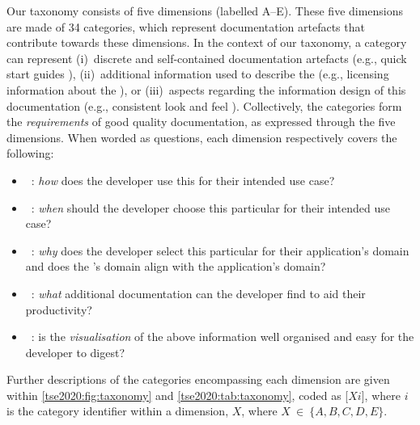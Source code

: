 Our taxonomy consists of five dimensions (labelled A--E). These five dimensions are made of 34 categories, which represent   documentation artefacts that contribute towards these dimensions. In the context of our taxonomy, a category can represent (i)~discrete and self-contained documentation artefacts (e.g., quick start guides ), (ii)~additional information used to describe the  (e.g., licensing information about the  ), or (iii)~aspects regarding the information design of this documentation (e.g., consistent look and feel ). {Collectively, the categories form the \textit{requirements} of good quality  documentation, as expressed through the five dimensions.} When worded as questions, each dimension respectively covers the following:

\begin{itemize}
  \item {}~\textbf{\dima{}}: \textit{how} does the developer use this  for their intended use case?
  \item {}~\textbf{\dimb{}}: \textit{when} should the developer choose this particular  for their intended use case?
  \item {}~\textbf{\dimc{}}: \textit{why} does the developer select this particular  for their application's domain and does the 's domain align with the application's domain?
  \item {}~\textbf{\dimd{}}: \textit{what} additional  documentation can the developer find to aid their productivity?
  \item {}~\textbf{\dime{}}: is the \textit{visualisation} of the above information well organised and easy for the developer to digest?
\end{itemize}
Further descriptions of the categories encompassing each dimension are given within \cref{tse2020:fig:taxonomy} and \cref{tse2020:tab:taxonomy}, coded as [$Xi$], where $i$ is the category identifier within a dimension, $X$, where $X~\in~\{ A, B, C, D, E \}$.

